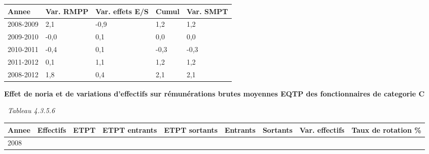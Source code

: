 \begin{longtable}[]{@{}lllll@{}}
\toprule
Annee & Var. RMPP & Var. effets E/S & Cumul & Var. SMPT\tabularnewline
\midrule
\endhead
2008-2009 & 2,1 & -0,9 & 1,2 & 1,2\tabularnewline
2009-2010 & -0,0 & 0,1 & 0,0 & 0,0\tabularnewline
2010-2011 & -0,4 & 0,1 & -0,3 & -0,3\tabularnewline
2011-2012 & 0,1 & 1,1 & 1,2 & 1,2\tabularnewline
2008-2012 & 1,8 & 0,4 & 2,1 & 2,1\tabularnewline
\bottomrule
\end{longtable}

\textbf{Effet de noria et de variations d'effectifs sur rémunérations
brutes moyennes EQTP des fonctionnaires de categorie C}

~\emph{Tableau 4.3.5.6}

\begin{longtable}[]{@{}lllllllll@{}}
\toprule
\begin{minipage}[b]{0.05\columnwidth}\raggedright
Annee\strut
\end{minipage} & \begin{minipage}[b]{0.08\columnwidth}\raggedright
Effectifs\strut
\end{minipage} & \begin{minipage}[b]{0.05\columnwidth}\raggedright
ETPT\strut
\end{minipage} & \begin{minipage}[b]{0.10\columnwidth}\raggedright
ETPT entrants\strut
\end{minipage} & \begin{minipage}[b]{0.10\columnwidth}\raggedright
ETPT sortants\strut
\end{minipage} & \begin{minipage}[b]{0.07\columnwidth}\raggedright
Entrants\strut
\end{minipage} & \begin{minipage}[b]{0.07\columnwidth}\raggedright
Sortants\strut
\end{minipage} & \begin{minipage}[b]{0.11\columnwidth}\raggedright
Var. effectifs\strut
\end{minipage} & \begin{minipage}[b]{0.14\columnwidth}\raggedright
Taux de rotation \%\strut
\end{minipage}\tabularnewline
\midrule
\endhead
\begin{minipage}[t]{0.05\columnwidth}\raggedright
2008\strut
\end{minipage} & \begin{minipage}[t]{0.08\columnwidth}\raggedright

\end{minipage}
\end{longtable}
